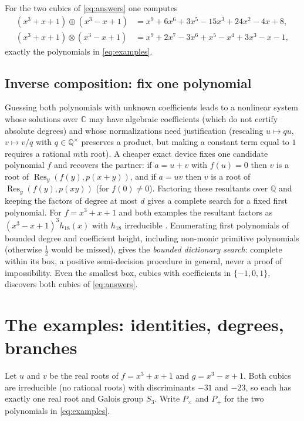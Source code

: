 \documentclass[11pt,a4paper]{article}
\theoremstyle{definition}
\theoremstyle{remark}
\newcommand{\Q}{\mathbb{Q}}
\newcommand{\C}{\mathbb{C}}
\newcommand{\Res}{\operatorname{Res}}
\begin{document}
For the two cubics of \eqref{eq:answers} one computes
\begin{equation}\label{eq:resultants}
\begin{aligned}
 (x^3+x+1)\oplus(x^3-x+1)&=x^9+6x^6+3x^5-15x^3+24x^2-4x+8,\\
 (x^3+x+1)\otimes(x^3-x+1)&=x^9+2x^7-3x^6+x^5-x^4+3x^3-x-1,
\end{aligned}
\end{equation}
exactly the polynomials in \eqref{eq:examples}.

\subsection{Inverse composition: fix one polynomial}

Guessing both polynomials with unknown coefficients leads to a nonlinear system whose solutions over
$\C$ may have algebraic coefficients (which do not certify absolute degrees) and whose normalizations
need justification (rescaling $u\mapsto qu$, $v\mapsto v/q$ with $q\in\Q^\times$ preserves a product,
but making a constant term equal to $1$ requires a rational $m$th root).  A cheaper exact device fixes
one candidate polynomial $f$ and recovers the partner: if $a=u+v$ with $f(u)=0$ then $v$ is a root of
$\Res_y(f(y),p(x+y))$, and if $a=uv$ then $v$ is a root of $\Res_y(f(y),p(xy))$ (for $f(0)\ne0$).
Factoring these resultants over $\Q$ and keeping the factors of degree at most $d$ gives a complete
search for a fixed first polynomial.  For $f=x^3+x+1$ and both examples the resultant factors as
$(x^3-x+1)^3h_{18}(x)$ with $h_{18}$ irreducible \cite{r2,r4}.  Enumerating first polynomials of
bounded degree and coefficient height, including non-monic primitive polynomials (otherwise
$\tfrac12$ would be missed), gives the \emph{bounded dictionary search}: complete within its box, a
positive semi-decision procedure in general, never a proof of impossibility.  Even the smallest box,
cubics with coefficients in $\{-1,0,1\}$, discovers both cubics of \eqref{eq:answers}.

\section{The examples: identities, degrees, branches}\label{sec:examples}

Let $u$ and $v$ be the real roots of $f=x^3+x+1$ and $g=x^3-x+1$.  Both cubics are irreducible (no
rational roots) with discriminants $-31$ and $-23$, so each has exactly one real root and Galois group
$S_3$.  Write $P_\times$ and $P_+$ for the two polynomials in \eqref{eq:examples}.
\end{document}
